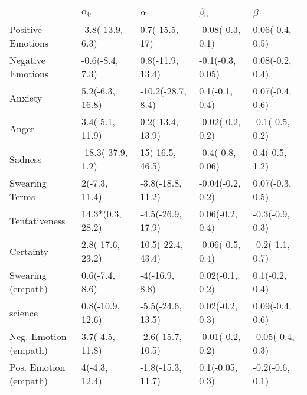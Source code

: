\begin{tabular}{lllll}
\toprule
{} &         $\alpha_0$ &           $\alpha$ &         $\beta_0$ &           $\beta$ \\
\midrule
Positive Emotions     &   -3.8(-13.9, 6.3) &     0.7(-15.5, 17) &  -0.08(-0.3, 0.1) &   0.06(-0.4, 0.5) \\
Negative Emotions     &    -0.6(-8.4, 7.3) &   0.8(-11.9, 13.4) &  -0.1(-0.3, 0.05) &   0.08(-0.2, 0.4) \\
Anxiety               &    5.2(-6.3, 16.8) &  -10.2(-28.7, 8.4) &    0.1(-0.1, 0.4) &   0.07(-0.4, 0.6) \\
Anger                 &    3.4(-5.1, 11.9) &   0.2(-13.4, 13.9) &  -0.02(-0.2, 0.2) &   -0.1(-0.5, 0.2) \\
Sadness               &  -18.3(-37.9, 1.2) &    15(-16.5, 46.5) &  -0.4(-0.8, 0.06) &    0.4(-0.5, 1.2) \\
Swearing Terms        &      2(-7.3, 11.4) &  -3.8(-18.8, 11.2) &  -0.04(-0.2, 0.2) &   0.07(-0.3, 0.5) \\
Tentativeness         &   14.3*(0.3, 28.2) &  -4.5(-26.9, 17.9) &   0.06(-0.2, 0.4) &   -0.3(-0.9, 0.3) \\
Certainty             &   2.8(-17.6, 23.2) &  10.5(-22.4, 43.4) &  -0.06(-0.5, 0.4) &   -0.2(-1.1, 0.7) \\
Swearing (empath)     &     0.6(-7.4, 8.6) &     -4(-16.9, 8.8) &   0.02(-0.1, 0.2) &    0.1(-0.2, 0.4) \\
science               &   0.8(-10.9, 12.6) &  -5.5(-24.6, 13.5) &   0.02(-0.2, 0.3) &   0.09(-0.4, 0.6) \\
Neg. Emotion (empath) &    3.7(-4.5, 11.8) &  -2.6(-15.7, 10.5) &  -0.01(-0.2, 0.2) &  -0.05(-0.4, 0.3) \\
Pos. Emotion (empath) &      4(-4.3, 12.4) &  -1.8(-15.3, 11.7) &   0.1(-0.05, 0.3) &   -0.2(-0.6, 0.1) \\
\bottomrule
\end{tabular}
